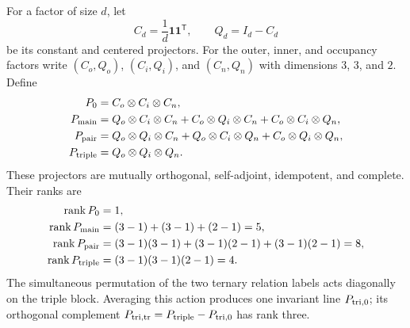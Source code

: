 \documentclass[11pt]{article}
\numberwithin{equation}{section}
\theoremstyle{remark}
\newcommand{\rank}{\operatorname{rank}}
\begin{document}
For a factor of size $d$, let
\begin{equation}
C_d=\frac1d\bm1\bm1^{\mathsf T},
\qquad
Q_d=I_d-C_d
\end{equation}
be its constant and centered projectors. For the outer, inner, and occupancy factors write $(C_o,Q_o)$, $(C_i,Q_i)$, and $(C_n,Q_n)$ with dimensions $3$, $3$, and $2$. Define
\begin{align}
P_0&=C_o\otimes C_i\otimes C_n,\\
P_{\rm main}&=Q_o\otimes C_i\otimes C_n+C_o\otimes Q_i\otimes C_n+C_o\otimes C_i\otimes Q_n,\\
P_{\rm pair}&=Q_o\otimes Q_i\otimes C_n+Q_o\otimes C_i\otimes Q_n+C_o\otimes Q_i\otimes Q_n,\\
P_{\rm triple}&=Q_o\otimes Q_i\otimes Q_n.
\end{align}
These projectors are mutually orthogonal, self-adjoint, idempotent, and complete. Their ranks are
\begin{align}
\rank P_0&=1,\\
\rank P_{\rm main}&=(3-1)+(3-1)+(2-1)=5,\\
\rank P_{\rm pair}&=(3-1)(3-1)+(3-1)(2-1)+(3-1)(2-1)=8,\\
\rank P_{\rm triple}&=(3-1)(3-1)(2-1)=4.
\end{align}
The simultaneous permutation of the two ternary relation labels acts diagonally on the triple block. Averaging this action produces one invariant line $P_{\rm tri,0}$; its orthogonal complement $P_{\rm tri,tr}=P_{\rm triple}-P_{\rm tri,0}$ has rank three.
\end{document}
